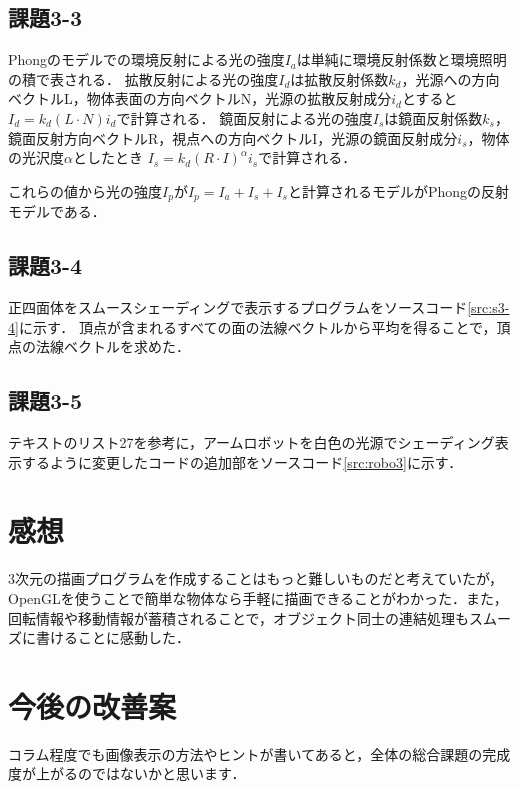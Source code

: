 \documentclass[twocolumn]{jsarticle}%
\begin{document}
\subsection{課題3-3}
Phongのモデルでの環境反射による光の強度$I_a$は単純に環境反射係数と環境照明の積で表される．
拡散反射による光の強度$I_d$は拡散反射係数$k_d$，光源への方向ベクトルL，物体表面の方向ベクトルN，光源の拡散反射成分$i_d$とすると
$I_d = k_d(L{\cdot}N)i_d$で計算される．
鏡面反射による光の強度$I_s$は鏡面反射係数$k_s$，鏡面反射方向ベクトルR，視点への方向ベクトルI，光源の鏡面反射成分$i_s$，物体の光沢度$\alpha$としたとき
$I_s = k_d(R{\cdot}I)^{\alpha}i_s$で計算される．

これらの値から光の強度$I_p$が$I_p = I_a + I_s + I_s$と計算されるモデルがPhongの反射モデルである．

\subsection{課題3-4}
正四面体をスムースシェーディングで表示するプログラムをソースコード\ref{src:s3-4}に示す．
頂点が含まれるすべての面の法線ベクトルから平均を得ることで，頂点の法線ベクトルを求めた．

\subsection{課題3-5}
テキストのリスト27を参考に，アームロボットを白色の光源でシェーディング表示するように変更したコードの追加部をソースコード\ref{src:robo3}に示す．

\onecolumn
\section{感想}
3次元の描画プログラムを作成することはもっと難しいものだと考えていたが，OpenGLを使うことで簡単な物体なら手軽に描画できることがわかった．また，回転情報や移動情報が蓄積されることで，オブジェクト同士の連結処理もスムーズに書けることに感動した．

\section{今後の改善案}
コラム程度でも画像表示の方法やヒントが書いてあると，全体の総合課題の完成度が上がるのではないかと思います．




\end{document}
